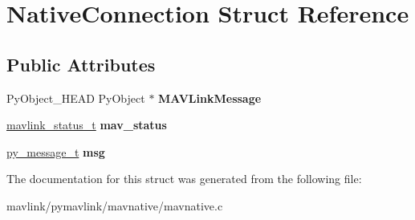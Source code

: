 \hypertarget{structNativeConnection}{}\section{Native\+Connection Struct Reference}
\label{structNativeConnection}
\subsection*{Public Attributes}
\begin{DoxyCompactItemize}
\item 
\mbox{\label{structNativeConnection_a6e972be69603d3a7c4a733476aaa5879}} 
Py\+Object\+\_\+\+H\+E\+AD Py\+Object $\ast$ {\bfseries M\+A\+V\+Link\+Message}
\item 
\mbox{\label{structNativeConnection_a8e3e37ebe9d5bddafac97584e6b848ba}} 
\hyperlink{struct____mavlink__status}{mavlink\+\_\+status\+\_\+t} {\bfseries mav\+\_\+status}
\item 
\mbox{\label{structNativeConnection_a593cfa273b85b9065e6699b46507cf98}} 
\hyperlink{structpy__message__t}{py\+\_\+message\+\_\+t} {\bfseries msg}
\end{DoxyCompactItemize}


The documentation for this struct was generated from the following file\+:\begin{DoxyCompactItemize}
\item 
mavlink/pymavlink/mavnative/mavnative.\+c\end{DoxyCompactItemize}
